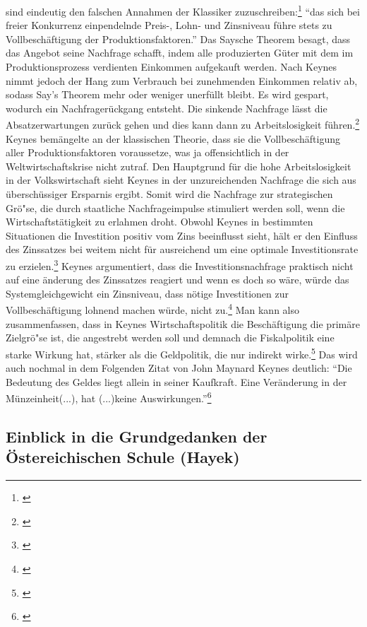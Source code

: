 \documentclass[
        onecolumn,
        a4paper,
        abstracton,
        parskip=half
        ,final
        ]{scrartcl}
\begin{document}
sind eindeutig den falschen Annahmen der Klassiker zuzuschreiben:\footnote[603]{\citep[S.36]{Keynes2011}} "`das sich bei freier Konkurrenz einpendelnde Preis-, Lohn- und Zinsniveau f{\"u}hre stets zu Vollbesch{\"a}ftigung der Produktionsfaktoren."'
Das Saysche Theorem besagt, dass das Angebot seine Nachfrage schafft, indem alle produzierten G{\"u}ter mit dem im Produktionsprozess verdienten
Einkommen aufgekauft werden. Nach Keynes nimmt jedoch der Hang zum Verbrauch bei zunehmenden Einkommen relativ ab, sodass Say's Theorem mehr oder weniger unerf{\"u}llt bleibt. Es wird gespart, wodurch ein Nachfrager{\"u}ckgang entsteht. Die sinkende
Nachfrage l{\"a}sst die Absatzerwartungen zur{\"u}ck gehen und dies kann dann zu Arbeitslosigkeit f{\"u}hren.\footnote[604]{\citep[S.203]{peters2000}} Keynes bem{\"a}ngelte an der klassischen Theorie, dass sie die Vollbesch{\"a}ftigung aller Produktionsfaktoren voraussetze, was ja offensichtlich in
der Weltwirtschaftskrise nicht zutraf. Den Hauptgrund f{\"u}r die hohe Arbeitslosigkeit in der Volkswirtschaft sieht Keynes in der unzureichenden Nachfrage die sich aus {\"u}bersch{\"u}ssiger Ersparnis ergibt. Somit wird die Nachfrage zur strategischen Gr{\"o}{"s}e,
die durch staatliche Nachfrageimpulse stimuliert werden soll, wenn die
Wirtschaftst{\"a}tigkeit zu erlahmen droht. Obwohl Keynes in bestimmten Situationen die
Investition positiv vom Zins beeinflusst sieht, h{\"a}lt er den Einfluss des Zinssatzes
bei weitem nicht f{\"u}r ausreichend um eine optimale Investitionsrate zu erzielen.\footnote[605]{\citep[S.208]{peters2000}}
Keynes argumentiert, dass die Investitionsnachfrage praktisch nicht auf eine
{\"a}nderung des Zinssatzes reagiert und wenn es doch so w{\"a}re, w{\"u}rde das Systemgleichgewicht
ein Zinsniveau, dass n{\"o}tige Investitionen zur Vollbesch{\"a}ftigung lohnend machen w{\"u}rde,
nicht zu.\footnote[606]{ \citep[S.174]{bombach1981theorie}}
Man kann also zusammenfassen, dass in Keynes Wirtschaftspolitik die Besch{\"a}ftigung
die prim{\"a}re Zielgr{\"o}{"s}e ist, die angestrebt werden soll und demnach die Fiskalpolitik
eine starke Wirkung hat, st{\"a}rker als die Geldpolitik, die nur indirekt wirke.\footnote[607]{ \citep[S.181]{bombach1981theorie}}
Das wird auch nochmal in dem Folgenden Zitat von John Maynard Keynes deutlich:
"`Die Bedeutung des Geldes liegt allein in seiner Kaufkraft. Eine Ver{\"a}nderung in der
M{\"u}nzeinheit(...), hat (...)keine Auswirkungen."'\footnote[608]{\citep[S.1]{Keynes1997}}




\subsection{Einblick in die Grundgedanken der {\"O}stereichischen Schule (Hayek)} %
\end{document}
